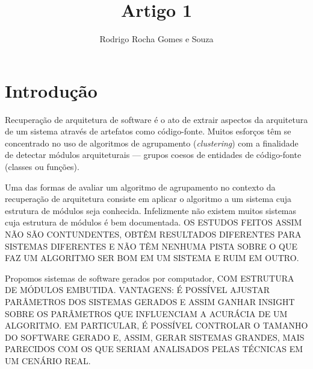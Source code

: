 \documentclass{acm_proc_article-sp}
\begin{document}
\title{Artigo 1} %
\author{Rodrigo Rocha Gomes e Souza}
\maketitle

\begin{abstract}



\end{abstract}

\section{Introdução} %

\cite{Newman2003}

% 
% 

Recuperação de arquitetura de software é o ato de extrair aspectos da arquitetura de um sistema através de artefatos como código-fonte. Muitos esforços têm se concentrado no uso de algoritmos de agrupamento (\emph{clustering}) com a finalidade de detectar módulos arquiteturais --- grupos coesos de entidades de código-fonte (classes ou funções).

Uma das formas de avaliar um algoritmo de agrupamento no contexto da recuperação de arquitetura consiste em aplicar o algoritmo a um sistema cuja estrutura de módulos seja conhecida. Infelizmente não existem muitos sistemas cuja estrutura de módulos é bem documentada. OS ESTUDOS FEITOS ASSIM NÃO SÃO CONTUNDENTES, OBTÊM RESULTADOS DIFERENTES PARA SISTEMAS DIFERENTES E NÃO TÊM NENHUMA PISTA SOBRE O QUE FAZ UM ALGORITMO SER BOM EM UM SISTEMA E RUIM EM OUTRO.

Propomos sistemas de software gerados por computador, COM ESTRUTURA DE MÓDULOS EMBUTIDA. VANTAGENS: É POSSÍVEL AJUSTAR PARÂMETROS DOS SISTEMAS GERADOS E ASSIM GANHAR INSIGHT SOBRE OS PARÂMETROS QUE INFLUENCIAM A ACURÁCIA DE UM ALGORITMO. EM PARTICULAR, É POSSÍVEL CONTROLAR O TAMANHO DO SOFTWARE GERADO E, ASSIM, GERAR SISTEMAS GRANDES, MAIS PARECIDOS COM OS QUE SERIAM ANALISADOS PELAS TÉCNICAS EM UM CENÁRIO REAL.
\end{document}
